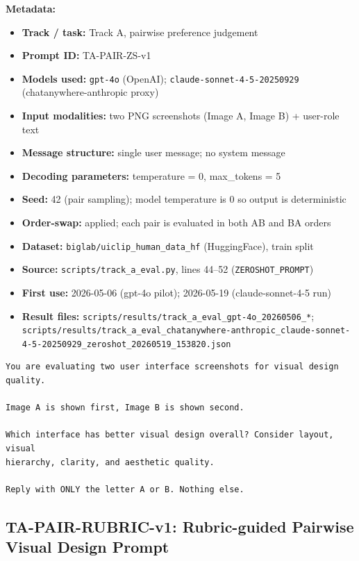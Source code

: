 \textbf{Metadata:}
\begin{itemize}
  \item \textbf{Track / task:} Track A, pairwise preference judgement
  \item \textbf{Prompt ID:} TA-PAIR-ZS-v1
  \item \textbf{Models used:} \texttt{gpt-4o} (OpenAI); \texttt{claude-sonnet-4-5-20250929} (chatanywhere-anthropic proxy)
  \item \textbf{Input modalities:} two PNG screenshots (Image A, Image B) + user-role text
  \item \textbf{Message structure:} single user message; no system message
  \item \textbf{Decoding parameters:} temperature = 0, max\_tokens = 5
  \item \textbf{Seed:} 42 (pair sampling); model temperature is 0 so output is deterministic
  \item \textbf{Order-swap:} applied; each pair is evaluated in both AB and BA orders
  \item \textbf{Dataset:} \texttt{biglab/uiclip\_human\_data\_hf} (HuggingFace), train split
  \item \textbf{Source:} \texttt{scripts/track\_a\_eval.py}, lines 44--52 (\texttt{ZEROSHOT\_PROMPT})
  \item \textbf{First use:} 2026-05-06 (gpt-4o pilot); 2026-05-19 (claude-sonnet-4-5 run)
  \item \textbf{Result files:} \texttt{scripts/results/track\_a\_eval\_gpt-4o\_20260506\_*}; \texttt{scripts/results/track\_a\_eval\_chatanywhere-anthropic\_claude-sonnet-4-5-20250929\_zeroshot\_20260519\_153820.json}
\end{itemize}

\begingroup
\scriptsize
\begin{verbatim}
You are evaluating two user interface screenshots for visual design quality.

Image A is shown first, Image B is shown second.

Which interface has better visual design overall? Consider layout, visual
hierarchy, clarity, and aesthetic quality.

Reply with ONLY the letter A or B. Nothing else.
\end{verbatim}
\endgroup

\subsection{TA-PAIR-RUBRIC-v1: Rubric-guided Pairwise Visual Design Prompt}
\label{app:prompt-ta-pair-rubric-v1}

